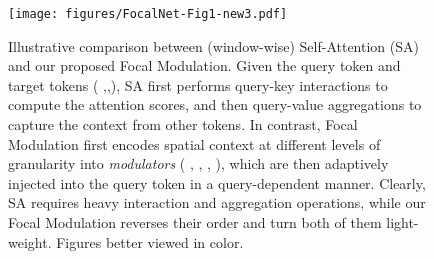 \documentclass{article}
\begin{document}
\begin{figure}[t]
	\centering
	\texttt{[image: figures/FocalNet-Fig1-new3.pdf]}
    \captionsetup{font=footnotesize}
    \caption{Illustrative comparison between (window-wise) Self-Attention (SA)~\cite{vaswani2017attention,dosovitskiy2020image,liu2021swin} and our proposed Focal Modulation. Given the query token  and target tokens ( ,,), SA first performs query-key interactions to compute the attention scores, and then query-value aggregations to capture the context from other tokens. In contrast, Focal Modulation first encodes spatial context at different levels of granularity into \emph{modulators} (  ,  , , ), which are then adaptively injected into the query token in a query-dependent manner. Clearly, SA requires heavy interaction and aggregation operations, while our Focal Modulation reverses their order and turn both of them light-weight. Figures better viewed in color.
}
    \vspace{-6mm}
    \label{fig:teaser}
\end{figure}
\end{document}
